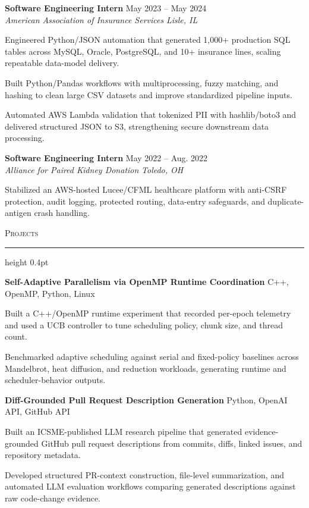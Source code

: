 \documentclass[letterpaper,11pt]{article}
\newcommand{\resumesection}[1]{%
  \par\vspace{2pt}%
  {\large\scshape #1}\par\vspace{2pt}%
  \hrule height 0.4pt\vspace{2pt}%
}
\newcommand{\resumeSubheading}[4]{
  \textbf{#1} \hfill #2\\
  \textit{#3} \hfill \textit{#4}
}
\newcommand{\projectHeading}[2]{
  \textbf{#1} \hfill #2
}
\begin{document}
\resumeSubheading
{Software Engineering Intern}{May 2023 -- May 2024}
{American Association of Insurance Services}{Lisle, IL}
\begin{tightitemize}
  \item Engineered Python/JSON automation that generated 1,000+ production SQL tables across MySQL, Oracle, PostgreSQL, and 10+ insurance lines, scaling repeatable data-model delivery.
  \item Built Python/Pandas workflows with multiprocessing, fuzzy matching, and hashing to clean large CSV datasets and improve standardized pipeline inputs.
  \item Automated AWS Lambda validation that tokenized PII with hashlib/boto3 and delivered structured JSON to S3, strengthening secure downstream data processing.
\end{tightitemize}

\resumeSubheading
{Software Engineering Intern}{May 2022 -- Aug. 2022}
{Alliance for Paired Kidney Donation}{Toledo, OH}
\begin{tightitemize}
  \item Stabilized an AWS-hosted Lucee/CFML healthcare platform with anti-CSRF protection, audit logging, protected routing, data-entry safeguards, and duplicate-antigen crash handling.
\end{tightitemize}

\resumesection{Projects}
\projectHeading{Self-Adaptive Parallelism via OpenMP Runtime Coordination}{C++, OpenMP, Python, Linux}
\begin{tightitemize}
  \item Built a C++/OpenMP runtime experiment that recorded per-epoch telemetry and used a UCB controller to tune scheduling policy, chunk size, and thread count.
  \item Benchmarked adaptive scheduling against serial and fixed-policy baselines across Mandelbrot, heat diffusion, and reduction workloads, generating runtime and scheduler-behavior outputs.
\end{tightitemize}

\projectHeading{Diff-Grounded Pull Request Description Generation}{Python, OpenAI API, GitHub API}
\begin{tightitemize}
  \item Built an ICSME-published LLM research pipeline that generated evidence-grounded GitHub pull request descriptions from commits, diffs, linked issues, and repository metadata.
  \item Developed structured PR-context construction, file-level summarization, and automated LLM evaluation workflows comparing generated descriptions against raw code-change evidence.
\end{tightitemize}
\end{document}
